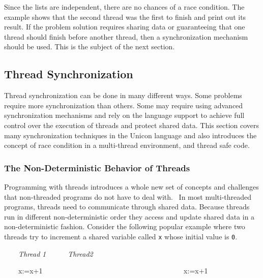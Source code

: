 
Since the lists are independent, there are no chances of a race
condition. The example shows that the second thread was the first to
finish and print out its result. If the problem solution requires
sharing data or guaranteeing that one thread should finish before
another thread, then a synchronization mechanism should be used. This
is the subject of the next section.

\subsection[Thread Synchronization]{Thread Synchronization}

Thread synchronization can be done in many different ways. Some problems
require more synchronization than others. Some may require using
advanced synchronization mechanisms and rely on the language support to
achieve full control over the execution of threads and protect shared
data. This section covers many synchronization techniques in the Unicon
language and also introduces the concept of race condition in a
multi-thread environment, and thread safe code.

\subsubsection[The Non{}-Deterministic Behavior of Threads ]{The
Non-Deterministic Behavior of Threads }

Programming with threads introduces a whole new set of concepts and
challenges that non-threaded programs do not have to deal with. \ In
most multi-threaded programs, threads need to communicate through
shared data. Because threads run in different non-deterministic order
they access and update shared data in a non-deterministic fashion.
Consider the following popular example where two threads try to
increment a shared variable called \texttt{x} whose initial
value is \texttt{0}.

\ \ \ \ \textit{Thread}\textit{ }\textit{1\ \ \ \ \ \ Thread2}\textit{
}\textit{\ \ \ \ }

\ \ \ \ x:=x+1
\ \ \ \ \ \ \ \ \ \ \ \ \ \ \ \ \ \ \ \ \ \ \ \ \ \ \ \ \ \ \ \ \ \ \ \ \ \ \ x:=x+1
\ \ \ \ \ \ \ \ \ \ \ \ \ \ \ \ \ \ \ \ \ \ 

